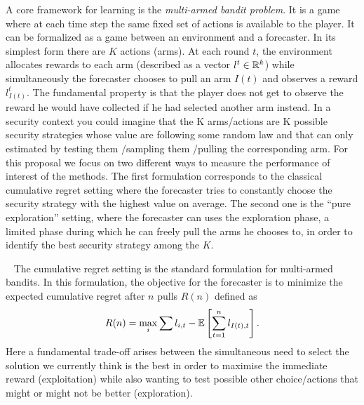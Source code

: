A core framework for learning is the \textit{multi-armed bandit problem}. It is a game where at each time step the same fixed set of actions is available to the player. It can be formalized as a game between an environment and a forecaster. In its simplest form there are $K$ actions (arms). At each round $t$, the environment allocates rewards to each arm (described as a vector $l^t\in\mathbb{R}^k$) while simultaneously the forecaster chooses to pull an arm $I(t)$ and observes a reward $l^t_{I(t)}$.  The fundamental property is that the player does not get to observe the reward he would have collected if he had selected another arm instead. In a security context you could imagine that the K arms/actions are K possible security strategies whose value are following some random law and that can  only estimated by testing  them /sampling them /pulling the corresponding arm. For this proposal we focus on two different ways to measure the performance of interest of the methods.  The first formulation corresponds to the classical cumulative regret setting where the forecaster tries to constantly choose the security strategy with the highest value on average.  The second one is the ``pure exploration'' setting, where the forecaster can uses the exploration phase, a limited phase during which he can freely pull the arms he chooses to, in order to identify the best  security strategy among the $K$.



\textbullet~ The cumulative regret setting is the standard formulation for multi-armed bandits. In this formulation, the objective for the forecaster is to minimize the expected cumulative regret after $n$ pulls $R(n)$ defined as
%
\begin{equation*}
R(n)=\max_i\sum l_{i,t}-{\mathbb{E}}\left[\sum_{t=1}^n l_{I(t),t}\right].
\end{equation*}
%
Here a fundamental trade-off arises between the simultaneous need to select the solution we currently think is the best in order to maximise the immediate reward  (exploitation)  while also wanting to test possible other choice/actions that might or might not be better (exploration).

